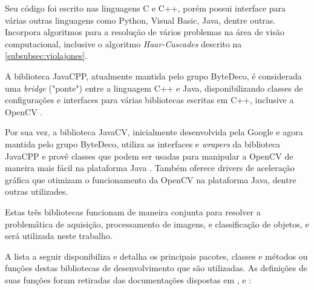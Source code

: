 Seu código foi escrito nas linguagens C e C++, porém possui interface para várias outras linguagens como Python, Visual Basic, Java, dentre outras. Incorpora algoritmos para a resolução de vários problemas na área de visão computacional, inclusive o algoritmo \textit{Haar-Cascades} descrito na \autoref{subsubsec:violajones}.

A biblioteca JavaCPP, atualmente mantida pelo grupo ByteDeco, é considerada uma \textit{bridge} ("ponte") entre a linguagem C++ e Java, disponibilizando classes de configurações e interfaces para várias bibliotecas escritas em C++, inclusive a OpenCV \cite{javacpp}.

Por sua vez, a biblioteca JavaCV, inicialmente desenvolvida pela Google e agora mantida pelo grupo ByteDeco, utiliza as interfaces e \textit{wrapers} da biblioteca JavaCPP e provê classes que podem ser usadas para manipular a  OpenCV de maneira mais fácil na plataforma Java \cite{javacv}. Também oferece drivers de aceleração gráfica que otimizam o funcionamento da OpenCV na plataforma Java, dentre outras utilizades.

Estas três bibliotecas funcionam de maneira conjunta para resolver a problemática de aquisição, processamento de imagens, e classificação de objetos, e será utilizada neste trabalho. 

A lista a seguir disponibiliza e detalha os principais pacotes, classes e métodos ou funções destas bibliotecas de desenvolvimento que são utilizadas. As definições de suas funções foram retiradas das documentações dispostas em ,  e : 

